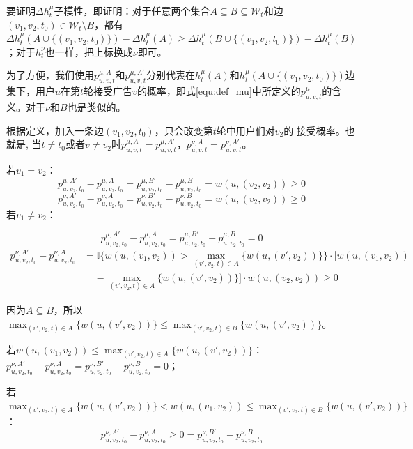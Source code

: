 要证明$\Delta h_t^\mu$子模性，即证明：对于任意两个集合$A\subseteq B \subseteq \mathcal{W}_t$和边$(v_1,v_2,t_0) \in \mathcal{W}_t \setminus B$，都有$\Delta h_t^\mu(A \cup \{(v_1,v_2,t_0)\})-\Delta h_t^\mu(A) \ge \Delta h_t^\mu(B\cup \{(v_1,v_2,t_0)\})- \Delta h_t^\mu(B)$；对于$h_t^\nu$也一样，把上标换成$\nu$即可。

为了方便，我们使用$p_{u,v,t}^{\mu,A}$和$p_{u,v,t}^{\mu,A'}$分别代表在$h_t^\mu(A)$和$h_t^\mu(A\cup\{(v_1,v_2,t_0)\})$边集下，用户$u$在第$t$轮接受广告$v$的概率，即式\ref{equ:def_mu}中所定义的$p_{u,v,t}^\mu$的含义。对于$\nu$和$B$也是类似的。

根据定义，加入一条边$(v_1,v_2,t_0)$，只会改变第$t$轮中用户们对$v_2$的 接受概率。也就是, 当$t\ne t_0$或者$v \ne v_2$时$p_{u,v,t}^{\mu,A}=p_{u,v,t}^{\mu,A'}$，$p_{u,v,t}^{\nu,A}=p_{u,v,t}^{\nu,A'}$。

若$v_1=v_2$：
\begin{equation}
p_{u,v_2,t_0}^{\mu,A'}-p_{u,v_2,t_0}^{\mu,A}=p_{u,v_2,t_0}^{\mu,B'}-p_{u,v_2,t_0}^{\mu,B} =w(u,(v_2,v_2)) \ge 0
\end{equation}
\begin{equation}
p_{u,v_2,t_0}^{\nu,A'}-p_{u,v_2,t_0}^{\nu,A}=p_{u,v_2,t_0}^{\nu,B'}-p_{u,v_2,t_0}^{\nu,B} =w(u,(v_2,v_2)) \ge 0
\end{equation}
若$v_1 \ne v_2$：

\begin{equation}
    p_{u,v_2,t_0}^{\mu,A'}-p_{u,v_2,t_0}^{\mu,A}=p_{u,v_2,t_0}^{\mu,B'}-p_{u,v_2,t_0}^{\mu,B} = 0 
\end{equation}
\begin{align}
    p_{u,v_2,t_0}^{\nu,A'}-p_{u,v_2,t_0}^{\nu,A}&=\mathbb{I}\{w(u,(v_1,v_2))>\max_{(v',v_2,t)\in A}\{w(u,(v',v_2))\}\} \cdot [w(u,(v_1,v_2)) \nonumber \\ 
    & \ \ \ \ \ -\max_{(v',v_2,t)\in A}\{w(u,(v',v_2))\}] \cdot w(u,(v_2,v_2)) \ge  0
\end{align}

因为$A \subseteq B$，所以$\max_{(v',v_2,t)\in A}\{w(u,(v',v_2))\} \le \max_{(v',v_2,t)\in B}\{w(u,(v',v_2))\}$。

若$w(u,(v_1,v_2))\le \max_{(v',v_2,t)\in A}\{w(u,(v',v_2))\}$：$p_{u,v_2,t_0}^{\nu,A'}-p_{u,v_2,t_0}^{\nu,A}=p_{u,v_2,t_0}^{\nu,B'}-p_{u,v_2,t_0}^{\nu,B}=0$；

若$\max_{(v',v_2,t)\in A}\{w(u,(v',v_2))\} < w(u,(v_1,v_2)) \le \max_{(v',v_2,t)\in B}\{w(u,(v',v_2))\}$：
\begin{equation}
p_{u,v_2,t_0}^{\nu,A'}-p_{u,v_2,t_0}^{\nu,A}\ge 0 = p_{u,v_2,t_0}^{\nu,B'}-p_{u,v_2,t_0}^{\nu,B}
\end{equation}

